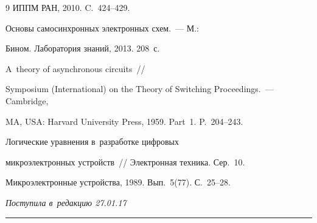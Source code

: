 {{\begin{thebibliography}{9}
ИППМ РАН, 2010. C.~424--429.




 Основы самосинхронных электронных схем.~--- М.: 


Бином. Лаборатория знаний, 2013. 208~с.




 A~theory of asynchronous circuits~/\!\!/  


Symposium (International) on the Theory of Switching Proceedings.~---  Cambridge, 


MA, USA: Harvard University Press, 1959. Part~1. P.~204--243.




 Логические уравнения в~разработке цифровых 


микроэлектронных устройств~/\!\!/ Электронная техника. Сер.~10. 


Микроэлектронные устройства, 1989. Вып.~5(77). С.~25--28.


       \end{thebibliography}


} }








\vspace*{-3pt}





\hfill{\small\textit{Поступила в~редакцию 27.01.17}}














\vspace*{9pt}





\hrule





\vspace*{2pt}















